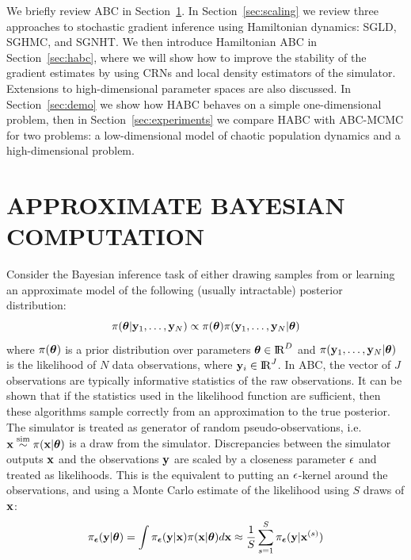 \documentclass[]{article}
\begin{document}
 
We briefly review ABC in Section~\ref{sec:abc}.  In Section~\ref{sec:scaling} we review three approaches to stochastic gradient inference using Hamiltonian dynamics: SGLD, SGHMC, and SGNHT.  We then introduce Hamiltonian ABC in Section~\ref{sec:habc}, where  we will show how to improve the stability of the gradient estimates by using CRNs and local density estimators of the simulator.  Extensions to high-dimensional parameter spaces are also discussed.  In Section~\ref{sec:demo} we show how HABC behaves on a simple one-dimensional problem, then in Section~\ref{sec:experiments} we compare HABC with ABC-MCMC for two problems: a low-dimensional model of chaotic population dynamics and a high-dimensional problem. 
 


\section{APPROXIMATE BAYESIAN COMPUTATION}\label{sec:abc}
Consider the Bayesian inference task of either drawing samples from or learning an approximate model of the following (usually intractable) posterior distribution:
\begin{equation}
  \pi({\bm \theta} | {\bf y}_1, \ldots, {\bf y}_N ) \propto \pi({\bm \theta}) \pi( {\bf y}_1, \ldots, {\bf y}_N  | {\bm \theta} )
\end{equation}
where $\pi({\bm \theta})$ is a prior distribution over parameters ${\bm \theta} \in {\rm I\!R}^{D}$ and $\pi( {\bf y}_1, \ldots, {\bf y}_N  | {\bm \theta} )$ is the likelihood of $N$ data observations, where ${\bf y}_i \in {\rm I\!R}^J$.  In ABC, the vector of $J$ observations are typically informative statistics of the raw observations.  It can be shown that if the statistics used in the likelihood function are sufficient, then these algorithms sample correctly from an approximation to the true posterior.  
  The simulator is treated as generator of random pseudo-observations, i.e. ${\bf x} \overset{\operatorname{sim}}{\sim} \pi( {\bf x} | {\bm \theta} )$ is a draw from the simulator.  Discrepancies between the simulator outputs ${\bf x}$ and the observations ${\bf y}$ are scaled by a closeness parameter $\epsilon$ and treated as likelihoods.  This is the equivalent to putting an $\epsilon$-kernel around the observations, and using a Monte Carlo estimate of the likelihood using $S$ draws of ${\bf x}$: 
\begin{equation}
  \pi_{{\bm {\epsilon}}}( {\bf y} | {\bm \theta} ) =  \int \pi_{{\bm {\epsilon}}}({\bf y} | {\bf x} ) \pi( {\bf x} | {\bm \theta} ) d{\bf x} 
                           \approx  \frac{1}{S} \sum_{s=1}^S \pi_{{\bm {\epsilon}}}({\bf y} | {\bf x}^{(s)} ) \label{eq:abc_mc_approx}
\end{equation}
\end{document}
